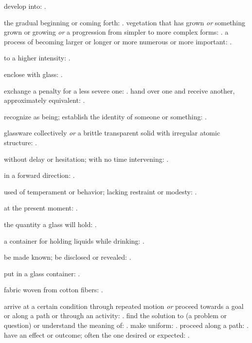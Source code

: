   develop into: .

  the gradual beginning or coming forth:   . vegetation that has grown \textit{or} something grown or growing \textit{or} a progression from simpler to more complex forms: . a process of becoming larger or longer or more numerous or more important:   .

  to a higher intensity: .

  enclose with glass:   .

  exchange a penalty for a less severe one:   . hand over one and receive another, approximately equivalent: .

  recognize as being; establish the identity of someone or something:   .

  glassware collectively \textit{or} a brittle transparent solid with irregular atomic structure: .

  without delay or hesitation; with no time intervening:   .

  in a forward direction:   .

  used of temperament or behavior; lacking restraint or modesty: .

  at the present moment:   .

  the quantity a glass will hold:   .

  a container for holding liquids while drinking:   .

  be made known; be disclosed or revealed:   .

  put in a glass container: .

  fabric woven from cotton fibers: .

  arrive at a certain condition through repeated motion \textit{or} proceed towards a goal or along a path or through an activity: . find the solution to (a problem or question) or understand the meaning of:   . make uniform:   . proceed along a path:   . have an effect or outcome; often the one desired or expected:   .


